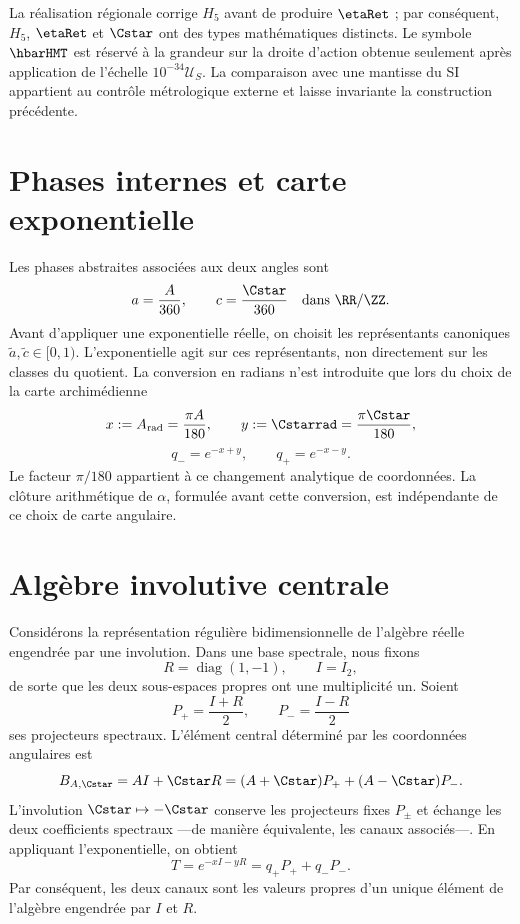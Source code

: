 La réalisation régionale corrige \(H_5\) avant de produire \(\etaRet\) ; par
conséquent, \(H_5\),
\(\etaRet\) et \(\Cstar\) ont des types mathématiques distincts. Le symbole
\(\hbarHMT\) est réservé à la grandeur sur la droite d'action obtenue
seulement après application de l'échelle \(10^{-34}\mathcal U_S\). La comparaison
avec une mantisse du SI appartient au contrôle métrologique externe et laisse
invariante la construction précédente.

\section{Phases internes et carte exponentielle}

Les phases abstraites associées aux deux angles sont
\[
 a=\frac A{360},\qquad c=\frac{\Cstar}{360}
 \quad\text{dans }\RR/\ZZ.
\]
Avant d'appliquer une exponentielle réelle, on choisit les représentants canoniques
\(\widetilde a,\widetilde c\in[0,1)\). L'exponentielle agit sur ces
représentants, non directement sur les classes du quotient.
La conversion en radians n'est introduite que lors du choix de la carte
archimédienne
\[
 x:=A_{\rm rad}=\frac{\pi A}{180},\qquad
 y:=\Cstarrad=\frac{\pi\Cstar}{180},
\]
\[
 q_-=e^{-x+y},\qquad q_+=e^{-x-y}.
\]
Le facteur \(\pi/180\) appartient à ce changement analytique de coordonnées. La
clôture arithmétique de \(\alpha\), formulée avant cette conversion, est
indépendante de ce choix de carte angulaire.

\section{Algèbre involutive centrale}

Considérons la représentation régulière bidimensionnelle de l'algèbre réelle
engendrée par une involution. Dans une base spectrale, nous fixons
\[
 R=\operatorname{diag}(1,-1),\qquad I=I_2,
\]
de sorte que les deux sous-espaces propres ont une multiplicité un. Soient
\[
 P_+=\frac{I+R}{2},\qquad P_-=\frac{I-R}{2}
\]
ses projecteurs spectraux. L'élément central déterminé par les
coordonnées angulaires est
\[
 B_{A,\Cstar}=AI+\Cstar R
 =(A+\Cstar)P_++(A-\Cstar)P_-.
\]
L'involution \(\Cstar\mapsto-\Cstar\) conserve les projecteurs fixes
\(P_\pm\) et échange les deux coefficients spectraux ---de manière équivalente,
les canaux associés---. En appliquant l'exponentielle, on obtient
\[
 T=e^{-xI-yR}=q_+P_++q_-P_-.
\]
Par conséquent, les deux canaux sont les valeurs propres d'un unique élément de
l'algèbre engendrée par \(I\) et \(R\).

